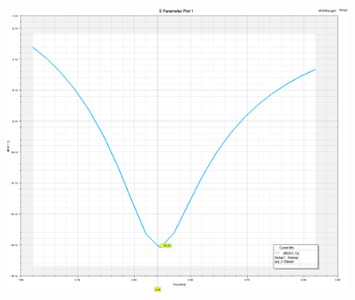 \documentclass[10pt, a4paper]{article}%
\begin{document}
	\begin{figure}[ht!]
		\centering
		\includegraphics[width = 1\textwidth,height = 0.4\textheight]{S11.png}
	\end{figure}
\clearpage
\end{document}
